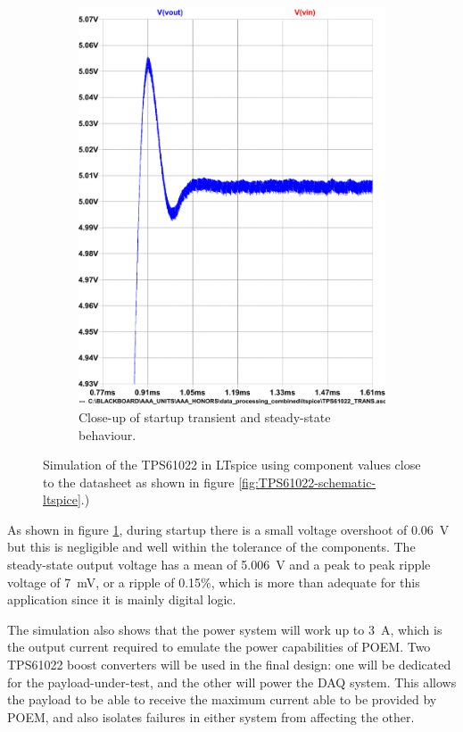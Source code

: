 \documentclass{report}
\begin{document}
\begin{figure}[H]
\begin{subfigure}{.5\textwidth}
    \includegraphics[width=\linewidth]{images/TPS61022-simulation-plot-overshoot.pdf}
    \caption{Close-up of startup transient and steady-state behaviour.}
  \end{subfigure}
  \caption{Simulation of the TPS61022 in LTspice using component values close to the datasheet as shown in figure \ref{fig:TPS61022-schematic-ltspice}.)}
  \label{fig:TPS61022-simulation-ltspice}
\end{figure}

As shown in figure \ref{fig:TPS61022-simulation-ltspice}, during startup there is a small voltage overshoot of \SI{0.06}{\volt} but this is negligible and well within the tolerance of the components. The steady-state output voltage has a mean of \SI{5.006}{\volt} and a peak to peak ripple voltage of \SI{7}{\milli\volt}, or a ripple of 0.15\%, which is more than adequate for this application since it is mainly digital logic.

The simulation also shows that the power system will work up to \SI{3}{\ampere}, which is the output current required to emulate the power capabilities of POEM. Two TPS61022 boost converters will be used in the final design: one will be dedicated for the payload-under-test, and the other will power the DAQ system. This allows the payload to be able to receive the maximum current able to be provided by POEM, and also isolates failures in either system from affecting the other.
\end{document}
